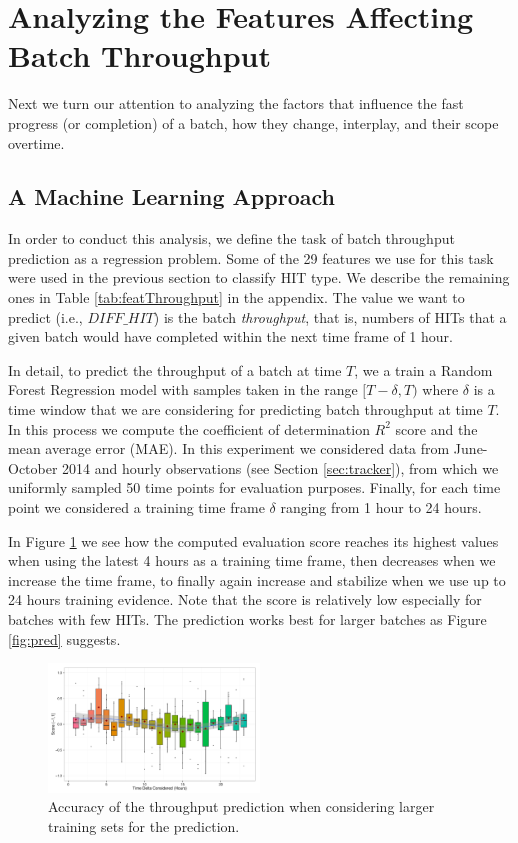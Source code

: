 \section{Analyzing the Features Affecting Batch Throughput}\label{sec:throughput}
Next we turn our attention to analyzing the factors that influence the fast progress (or completion) of a batch, how they change, interplay, and their scope overtime.
\subsection{A Machine Learning Approach}
In order to conduct this analysis, we define the task of batch throughput prediction as a regression problem.  Some of the   29  features we use for this task were used in the previous section to classify HIT type.  We describe the remaining ones in Table \ref{tab:featThroughput} in the appendix. The value  we want to predict (i.e.,   $DIFF\_HIT$) is the batch \emph{throughput}, that is, numbers of HITs that  a given batch would have completed within the next time frame of 1 hour.

In detail, to predict the throughput of a batch at time $T$, we a train a Random Forest Regression model with samples taken in the range $[T-\delta, T)$ where $\delta$ is a time window that we are   considering  for predicting batch throughput at time $T$. In this process we compute the coefficient of determination  $R^2$ score \cite{sklearn,sklearnweb} and the mean average error (MAE).
In this experiment we considered  data from June-October 2014 and hourly observations (see Section \ref{sec:tracker}), from which we uniformly sampled 50 time points for evaluation purposes. Finally, for each time point we considered a training time frame $\delta$ ranging from 1 hour to 24 hours. 

In Figure \ref{fig:accuracy} we see how the computed evaluation score reaches its highest values when using the latest 4 hours as a training time frame, then decreases when we increase the time frame, to finally again increase and stabilize when we use up to 24 hours training evidence.
Note that the score is relatively low especially for batches with few HITs. The prediction works best for larger batches as Figure \ref{fig:pred} suggests.

\begin{figure}[ht]
	\centering
		\includegraphics[width=0.5\textwidth]{figures/ML_accuracy}
	\caption{Accuracy of the throughput prediction when considering larger training sets for the prediction.}
	\label{fig:accuracy}
\end{figure}

